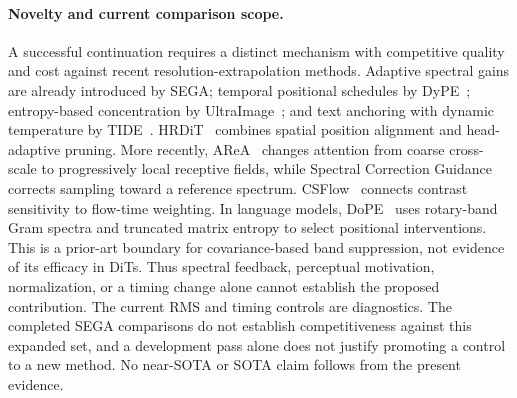 \paragraph{Novelty and current comparison scope.}
A successful continuation requires a distinct mechanism with competitive quality
and cost against recent resolution-extrapolation methods. Adaptive spectral gains
are already introduced by SEGA; temporal positional schedules by
DyPE~\citep{issachar2025dype}; entropy-based concentration by
UltraImage~\citep{ultraimage2025}; and text anchoring with dynamic temperature by
TIDE~\citep{tide2026}. HRDiT~\citep{hrdit2026} combines spatial position alignment
and head-adaptive pruning. More recently, AReA~\citep{area2026} changes attention
from coarse cross-scale to progressively local receptive fields, while Spectral
Correction Guidance~\citep{scg2026} corrects sampling toward a reference spectrum.
CSFlow~\citep{csflow2026} connects contrast sensitivity to flow-time weighting.
In language models, DoPE~\citep{xiong2025dope} uses rotary-band Gram spectra and
truncated matrix entropy to select positional interventions. This is a prior-art
boundary for covariance-based band suppression, not evidence of its efficacy in DiTs.
Thus spectral feedback, perceptual motivation, normalization, or a timing change
alone cannot establish the proposed contribution. The current RMS and timing
controls are diagnostics. The completed SEGA comparisons do not establish
competitiveness against this expanded set, and a development pass alone does not
justify promoting a control to a new method. No near-SOTA or SOTA claim follows
from the present evidence.


